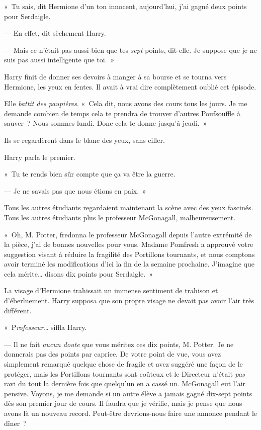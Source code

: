 «~Tu sais, dit Hermione d'un ton innocent, aujourd'hui, j'ai gagné deux points pour Serdaigle.

--- En effet, dit sèchement Harry.

--- Mais ce n'était pas aussi bien que tes \emph{sept} points, dit-elle. Je suppose que je ne suis pas aussi intelligente que toi.~»

Harry finit de donner ses devoirs à manger à sa bourse et se tourna vers Hermione, les yeux en fentes. Il avait à vrai dire complètement oublié cet épisode.

Elle \emph{battit des paupières}. «~Cela dit, nous avons des cours tous les jours. Je me demande combien de temps cela te prendra de trouver d'autres Poufsouffle à sauver~? Nous sommes lundi. Donc cela te donne jusqu'à jeudi.~»

Ils se regardèrent dans le blanc des yeux, sans ciller.

Harry parla le premier.

«~Tu te rends bien sûr compte que ça va être la guerre.

--- Je ne savais pas que nous étions en paix.~»

Tous les autres étudiants regardaient maintenant la scène avec des yeux fascinés. Tous les autres étudiants plus le professeur McGonagall, malheureusement.

«~Oh, M. Potter, fredonna le professeur McGonagall depuis l'autre extrémité de la pièce, j'ai de bonnes nouvelles pour vous. Madame Pomfresh a approuvé votre suggestion visant à réduire la fragilité des Portillons tournants, et nous comptons avoir terminé les modifications d'ici la fin de la semaine prochaine. J'imagine que cela mérite… disons dix points pour Serdaigle.~»

La visage d'Hermione trahissait un immense sentiment de trahison et d'éberluement. Harry supposa que son propre visage ne devait pas avoir l'air très différent.

«~P\emph{rofesseur…} siffla Harry.

--- Il ne fait \emph{aucun doute} que vous méritez ces dix points, M. Potter. Je ne donnerais pas des points par caprice. De votre point de vue, vous avez simplement remarqué quelque chose de fragile et avez suggéré une façon de le protéger, mais les Portillons tournants sont coûteux et le Directeur n'était \emph{pas} ravi du tout la dernière fois que quelqu'un en a cassé un. McGonagall eut l'air pensive. Voyons, je me demande si un autre élève a jamais gagné dix-sept points dès son premier jour de cours. Il faudra que je vérifie, mais je pense que nous avons là un nouveau record. Peut-être devrions-nous faire une annonce pendant le dîner~?

